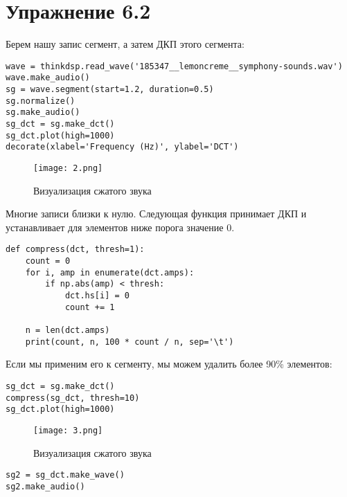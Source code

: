 \documentclass[a4paper,12pt]{report}
\begin{document}
\chapter{Упражнение 6.2}

Берем нашу запис сегмент, а затем ДКП этого сегмента:

\begin{lstlisting}[caption=Загрузка звука и сегмент]
wave = thinkdsp.read_wave('185347__lemoncreme__symphony-sounds.wav')
wave.make_audio()
sg = wave.segment(start=1.2, duration=0.5)
sg.normalize()
sg.make_audio()
sg_dct = sg.make_dct()
sg_dct.plot(high=1000)
decorate(xlabel='Frequency (Hz)', ylabel='DCT')
\end{lstlisting}

\begin{figure}[H]
        \centering
        \texttt{[image: 2.png]}
        \caption{Визуализация сжатого звука}
        \label{fig:lab6_fig2_1}
\end{figure}

Многие записи близки к нулю. Следующая функция принимает ДКП и устанавливает для элементов ниже порога значение 0.

\begin{lstlisting}[caption=Функция \texttt{compress}]
def compress(dct, thresh=1):
    count = 0
    for i, amp in enumerate(dct.amps):
        if np.abs(amp) < thresh:
            dct.hs[i] = 0
            count += 1
            
    n = len(dct.amps)
    print(count, n, 100 * count / n, sep='\t')
\end{lstlisting}

Если мы применим его к сегменту, мы можем удалить более 90\% элементов:

\begin{lstlisting}[caption=Сжатие звука]
sg_dct = sg.make_dct()
compress(sg_dct, thresh=10)
sg_dct.plot(high=1000)
\end{lstlisting}

\begin{figure}[H]
        \centering
        \texttt{[image: 3.png]}
        \caption{Визуализация сжатого звука}
        \label{fig:lab6_fig2_2}
\end{figure}

\begin{lstlisting}[caption=Воспроизведение сжатого звука]
sg2 = sg_dct.make_wave()
sg2.make_audio()
\end{lstlisting}
\end{document}
